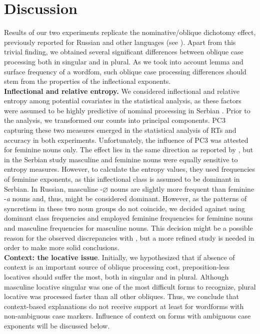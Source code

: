 \documentclass[output=paper, modfonts,newtxmath,hidelinks]{langscibook}
\begin{document}
\section{Discussion}
Results of our two experiments replicate the nominative\slash oblique dichotomy effect, previously reported for Russian and other languages (see ). Apart from this trivial finding, we obtained several significant differences between oblique case processing both in singular and in plural. As we took into account lemma and surface frequency of a wordfom, such oblique case processing differences should stem from the properties of the inflectional exponents.\\

\textbf{Inflectional and relative entropy.} We considered inflectional and relative entropy among potential covariates in the statistical analysis, as these factors were assumed to be highly predictive of nominal processing in Serbian \citep{milin2009simultaneous}. Prior to the analysis, we transformed our counts into principal components. PC3 capturing these two measures emerged in the statistical analysis of RTs and accuracy in both experiments. Unfortunately, the influence of PC3 was attested for feminine nouns only. The effect lies in the same direction as reported by \citet*{milin2009simultaneous}, but in the Serbian study masculine and feminine nouns were equally sensitive to entropy measures. However, to calculate the entropy values, they used frequencies of feminine exponents, as this inflectional class is assumed to be dominant in Serbian. In Russian, masculine -$\varnothing$ nouns are slightly more frequent than feminine -\textit{a} nouns \citep{samojlova2014frequencies} and, thus, might be considered dominant. However, as the patterns of syncretism in these two noun groups do not coincide, we decided against using dominant class frequencies and employed feminine frequencies for feminine nouns and masculine frequencies for masculine nouns. This decision might be a possible reason for the observed discrepancies with \citet{milin2009simultaneous}, but a more refined study is needed in order to make more solid conclusions.\\

\textbf{Context: the locative issue}. Initially, we hypothesized that if absence of context is an important source of oblique processing cost, preposition-less locatives should suffer the most, both in singular and in plural. Although masculine locative singular was one of the most difficult forms to recognize, plural locative was processed faster than all other obliques. Thus, we conclude that context-based explanations do not receive support at least for wordforms with non-ambiguous case markers. Influence of context on forms with ambiguous case exponents will be discussed below.\\
\end{document}
